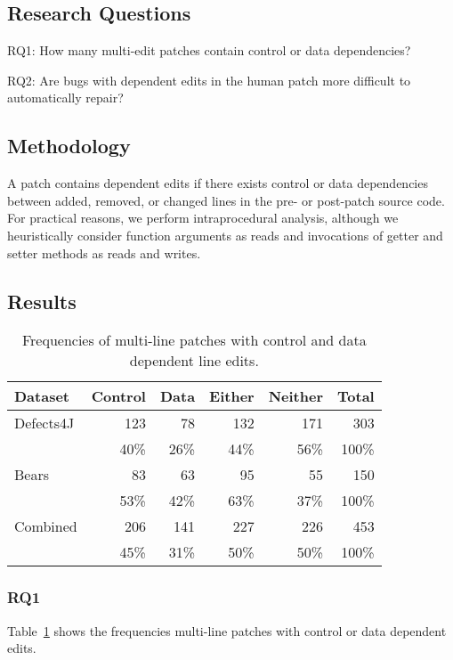 \documentclass[sigconf, timestamp-false, anonymous=true]{acmart}
\begin{document}
\subsection{Research Questions}

RQ1: How many multi-edit patches contain control or data dependencies?

RQ2: Are bugs with dependent edits in the human patch more difficult to automatically repair?

\subsection{Methodology}
A patch contains dependent edits if there exists control or data dependencies 
between added, removed, or changed lines in the pre- or post-patch
source code. For practical reasons, we perform intraprocedural analysis, 
although we heuristically consider function arguments as reads 
and invocations of getter and setter methods as reads and writes.

\subsection{Results}

\begin{table}
{\begin{center}
	\begin{tabular}{l | rrrr | r}
		\toprule
		Dataset & Control & Data & Either & Neither & Total \\
		\midrule
		Defects4J & 123 & 78 & 132 & 171 & 303 \\
		& 40\% & 26\% & 44\% & 56\% & 100\% \\
		Bears & 83 & 63 & 95 & 55 & 150 \\
		& 53\% & 42\% & 63\% & 37\% & 100\% \\
		\midrule
		Combined & 206 & 141 & 227 & 226 & 453 \\
		& 45\% & 31\% & 50\% & 50\% & 100\% \\
		\bottomrule
	\end{tabular}
 \end{center}
}
	\caption{Frequencies of multi-line patches with control and data dependent line edits.}
	\label{tab:dependency-frequencies}
\end{table}

\subsubsection{RQ1} Table~\ref{tab:dependency-frequencies} shows the 
frequencies multi-line patches with control or data dependent edits.
\end{document}
